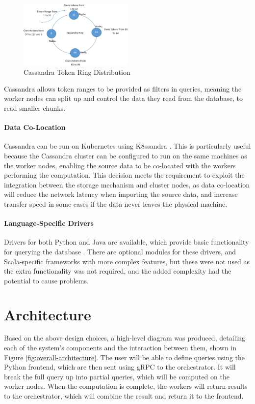 \begin{figure}[h]
	\centering
	\includegraphics[width=0.5\textwidth]{chapters/diagrams/design/cassandra-token-distribution}
	\caption{Cassandra Token Ring Distribution \protect\cite{khatibi2019dynamic}}
	\label{fig:cassandra-token-distribution}
\end{figure}

Cassandra allows token ranges to be provided as filters in queries,  meaning the worker nodes can split up and control the data they read from the database, to read smaller chunks. 

\paragraph{Data Co-Location} Cassandra can be run on Kubernetes using K8ssandra \cite{k8ssandra}. This is particularly useful because the Cassandra cluster can be configured to run on the same machines as the worker nodes, enabling the source data to be co-located with the workers performing the computation. This decision meets the requirement to exploit the integration between the storage mechanism and cluster nodes, as data co-location will reduce the network latency when importing the source data, and increase transfer speed in some cases if the data never leaves the physical machine.

\paragraph{Language-Specific Drivers} Drivers for both Python and Java are available, which provide basic functionality for querying the database \cite{datastaxjavadriver, datastaxpythondriver}. There are optional modules for these drivers, and Scala-specific frameworks with more complex features, but these were not used as the extra functionality was not required, and the added complexity had the potential to cause problems. 

\section{Architecture}\label{sec:architecture}
Based on the above design choices, a high-level diagram was produced, detailing each of the system's components and the interaction between them, shown in Figure \ref{fig:overall-architecture}. The user will be able to define queries using the Python frontend, which are then sent using gRPC to the orchestrator. It will break the full query up into partial queries, which will be computed on the worker nodes. When the computation is complete, the workers will return results to the orchestrator, which will combine the result and return it to the frontend.

